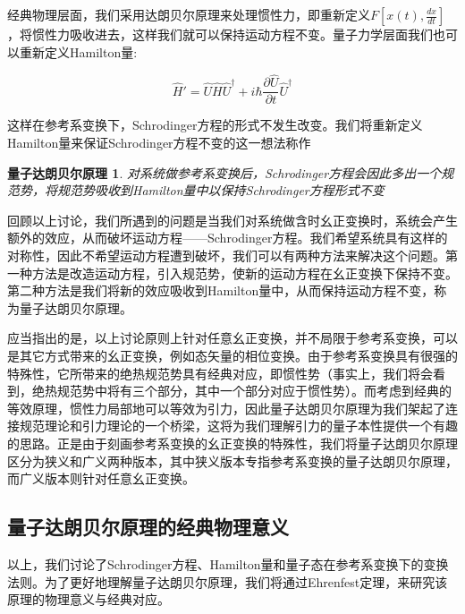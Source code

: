 \documentclass[a4paper]{article}
\newtheorem*{D'Alembert}{量子达朗贝尔原理}
\begin{document}
\begin{itemize}
            经典物理层面，我们采用达朗贝尔原理来处理惯性力，即重新定义$F[x(t),\frac{dx}{dt}]$，将惯性力吸收进去，这样我们就可以保持运动方程不变。量子力学层面我们也可以重新定义Hamilton量:
            
            \begin{equation}
                \hat{H}'=\hat{U}\hat{H}\hat{U}^\dagger + i\hbar\frac{\partial\hat{U}}{\partial t}\hat{U}^\dagger
            \end{equation}

            这样在参考系变换下，Schrodinger方程的形式不发生改变。我们将重新定义Hamilton量来保证Schrodinger方程不变的这一想法称作

            \begin{D'Alembert}
                对系统做参考系变换后，Schrodinger方程会因此多出一个规范势，将规范势吸收到Hamilton量中以保持Schrodinger方程形式不变
            \end{D'Alembert}
            
        \end{itemize}

        回顾以上讨论，我们所遇到的问题是当我们对系统做含时幺正变换时，系统会产生额外的效应，从而破坏运动方程——Schrodinger方程。我们希望系统具有这样的对称性，因此不希望运动方程遭到破坏，我们可以有两种方法来解决这个问题。第一种方法是改造运动方程，引入规范势，使新的运动方程在幺正变换下保持不变。第二种方法是我们将新的效应吸收到Hamilton量中，从而保持运动方程不变，称为量子达朗贝尔原理。

        应当指出的是，以上讨论原则上针对任意幺正变换，并不局限于参考系变换，可以是其它方式带来的幺正变换，例如态矢量的相位变换。由于参考系变换具有很强的特殊性，它所带来的绝热规范势具有经典对应，即惯性势（事实上，我们将会看到，绝热规范势中将有三个部分，其中一个部分对应于惯性势）。而考虑到经典的等效原理，惯性力局部地可以等效为引力，因此量子达朗贝尔原理为我们架起了连接规范理论和引力理论的一个桥梁，这将为我们理解引力的量子本性提供一个有趣的思路。正是由于刻画参考系变换的幺正变换的特殊性，我们将量子达朗贝尔原理区分为狭义和广义两种版本，其中狭义版本专指参考系变换的量子达朗贝尔原理，而广义版本则针对任意幺正变换。

    \subsection{量子达朗贝尔原理的经典物理意义}

        以上，我们讨论了Schrodinger方程、Hamilton量和量子态在参考系变换下的变换法则。为了更好地理解量子达朗贝尔原理，我们将通过Ehrenfest定理，来研究该原理的物理意义与经典对应。
\end{document}
